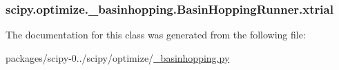 \subsubsection[{xtrial}]{\setlength{\rightskip}{0pt plus 5cm}scipy.\+optimize.\+\_\+basinhopping.\+Basin\+Hopping\+Runner.\+xtrial}\label{classscipy_1_1optimize_1_1__basinhopping_1_1BasinHoppingRunner_ac3f512962103da46e1e2859ebc40ad1f}


The documentation for this class was generated from the following file\+:\begin{DoxyCompactItemize}
\item 
packages/scipy-\/0../scipy/optimize/\hyperlink{__basinhopping_8py}{\+\_\+basinhopping.\+py}\end{DoxyCompactItemize}
